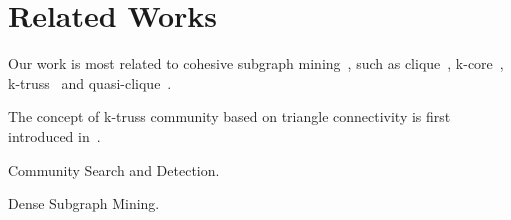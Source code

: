 \section{Related Works}
\label{relatedwork} 

Our work is most related to cohesive subgraph mining~\cite{durmaz2017frequent, koujaku2016dense, sozio2010community, cui2014local, li2015influential, cui2013online, mcauley2012learning}, such as clique~\cite{bron1973algorithm, rossi2014fast}, k-core~\cite{cheng2011efficient, shin2016corescope}, k-truss~\cite{huang2014querying, wang2012truss, cohen2008trusses, huang2015approximate, huang2016truss} and quasi-clique~\cite{tsourakakis2013denser}. 

The concept of k-truss community based on triangle connectivity is first introduced in~\cite{huang2014querying}. 

Community Search and Detection.

Dense Subgraph Mining.